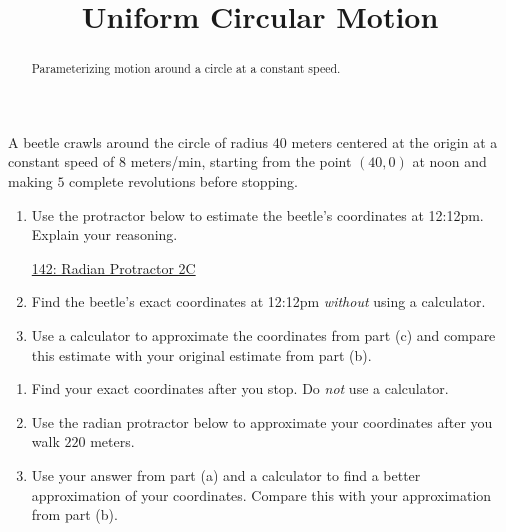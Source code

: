 \documentclass{ximera}
\title{Uniform Circular Motion}
\begin{document}
\begin{abstract}
Parameterizing motion around a circle at a constant speed.
\end{abstract}
\maketitle



\begin{example}  \label{Exp89dfe94tf4}

A beetle crawls around the circle of radius $40$ meters centered at the origin at a constant speed of $8$ meters/min, starting from the point $(40,0)$ at noon and making $5$ complete revolutions before stopping.

\begin{enumerate}

\item Use the protractor below to estimate the beetle's coordinates at 12:12pm. Explain your reasoning.

\begin{onlineOnly}
    \begin{center}
\end{center}
\end{onlineOnly}

\href{https://www.desmos.com/calculator/lbkveixdno}{142: Radian Protractor 2C}

\item Find the beetle's exact coordinates at 12:12pm \emph{without} using a calculator.

\item Use a calculator to approximate the coordinates from part (c) and compare this estimate with your original estimate from part (b).

\end{enumerate}

\end{example}


\begin{example} \label{Edfhg]hghgdfg}

\begin{enumerate}

\item Find your exact coordinates after you stop. Do \emph{not} use a calculator.

\item Use the radian protractor below to approximate your coordinates after you walk $220$ meters.
 
\item Use your answer from part (a) and a calculator to find a better approximation of your coordinates. Compare this with your approximation from part (b).



\end{enumerate}

\end{example}
\end{document}
